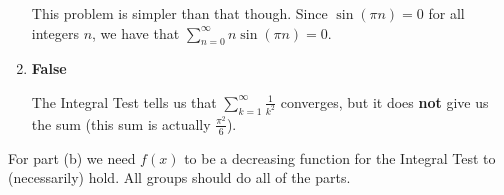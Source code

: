 \documentclass[handout,instructornotes]{ximera}
\begin{document}
\begin{problem}
\begin{freeResponse}
\begin{enumerate}
		This problem is simpler than that though.  
		Since $\sin(\pi n) = 0$ for all integers $n$, we have that $\sum_{n=0}^\infty n \sin(\pi n) = 0$.
		
		
		
		\item  {\bf False}
		
		The Integral Test tells us that $\sum_{k=1}^\infty \frac{1}{k^2}$ converges, but it does {\bf not} give us the sum (this sum is actually $\frac{\pi^2}{6}$).  
		
		\end{enumerate}
	\end{freeResponse}
	
\end{problem}

\begin{instructorNotes}
For part (b) we need $f(x)$ to be a decreasing function for the Integral Test to (necessarily) hold.
All groups should do all of the parts.
\end{instructorNotes}
\end{document}
